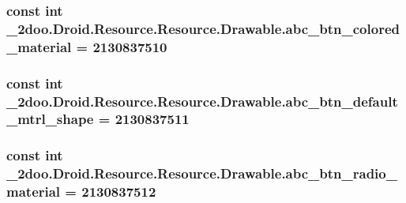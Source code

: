 \hypertarget{class__2doo_1_1_droid_1_1_resource_1_1_drawable_55f4f323c0852a200b69d29df14d639d}{
\subsubsection[{abc\_\-btn\_\-colored\_\-material}]{\setlength{\rightskip}{0pt plus 5cm}const int \_\-2doo.Droid.Resource.Resource.Drawable.abc\_\-btn\_\-colored\_\-material = 2130837510}}
\label{class__2doo_1_1_droid_1_1_resource_1_1_drawable_55f4f323c0852a200b69d29df14d639d}


\hypertarget{class__2doo_1_1_droid_1_1_resource_1_1_drawable_300fe3cb8e2fb2297422435ab700a86f}{
\subsubsection[{abc\_\-btn\_\-default\_\-mtrl\_\-shape}]{\setlength{\rightskip}{0pt plus 5cm}const int \_\-2doo.Droid.Resource.Resource.Drawable.abc\_\-btn\_\-default\_\-mtrl\_\-shape = 2130837511}}
\label{class__2doo_1_1_droid_1_1_resource_1_1_drawable_300fe3cb8e2fb2297422435ab700a86f}


\hypertarget{class__2doo_1_1_droid_1_1_resource_1_1_drawable_37bc5317ea3e1869b9a435c257501246}{
\subsubsection[{abc\_\-btn\_\-radio\_\-material}]{\setlength{\rightskip}{0pt plus 5cm}const int \_\-2doo.Droid.Resource.Resource.Drawable.abc\_\-btn\_\-radio\_\-material = 2130837512}}
\label{class__2doo_1_1_droid_1_1_resource_1_1_drawable_37bc5317ea3e1869b9a435c257501246}


